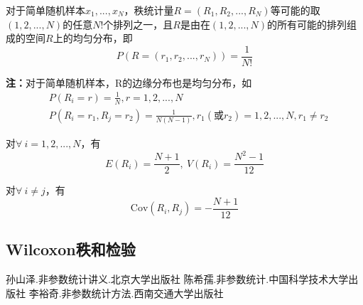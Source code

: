 \documentclass[lang=cn,10pt]{elegantbook}
\begin{document}
\begin{proposition}
    对于简单随机样本$x_1,...,x_{N}$，秩统计量$R = (R_1,R_2,...,R_N)$等可能的取$(1,2,...,N)$的任意$N!$个排列之一，且$R$是由在$(1,2,...,N)$的所有可能的排列组成的空间$R$上的均匀分布，即
    \begin{equation}
        P(R = (r_1,r_2,...,r_N)) = \frac{1}{N!}
    \end{equation}
\end{proposition}
\textbf{注：}对于简单随机样本，R的边缘分布也是均匀分布，如
\begin{equation}
    \begin{aligned}
        & P(R_i = r) = \frac1N, r = 1,2,...,N \\
        & P(R_i=r_1,R_j=r_2) = \frac1{N(N-1)}, r_1(\text{或}r_2) = 1,2,...,N, r_1\neq r_2
    \end{aligned}
\end{equation}

\begin{theorem}
    对$\forall~i = 1,2,...,N$，有
    \begin{equation}
        E(R_i)=\frac{N+1}2,~V(R_i)=\frac{N^2 -1}{12}
    \end{equation}
\end{theorem}

\begin{theorem}
    对$\forall~i \neq j$，有
    \begin{equation}
        \mathrm{Cov}(R_i,R_j) = -\frac{N+1}{12}
    \end{equation}
\end{theorem}

\subsection{Wilcoxon秩和检验}




\begin{thebibliography}{3}
    孙山泽.非参数统计讲义.北京大学出版社
    陈希孺.非参数统计.中国科学技术大学出版社
    李裕奇.非参数统计方法.西南交通大学出版社
\end{thebibliography}
\end{document}
